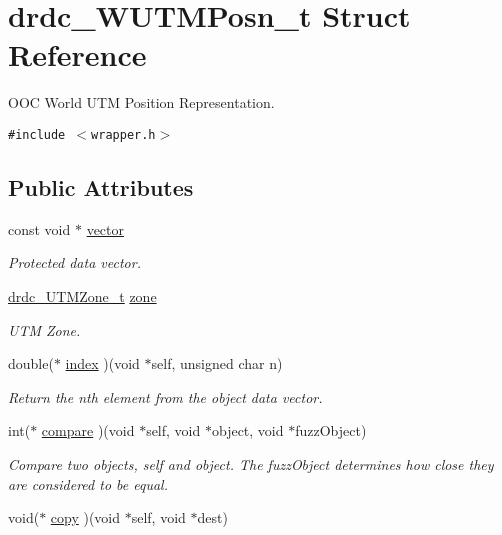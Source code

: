 \hypertarget{structdrdc__WUTMPosn__t}{
\section{drdc\_\-WUTMPosn\_\-t Struct Reference}
\label{structdrdc__WUTMPosn__t}
}
OOC World UTM Position Representation.  


{\tt \#include $<$wrapper.h$>$}

\subsection*{Public Attributes}
\begin{CompactItemize}
\item 
const void $\ast$ \hyperlink{structdrdc__WUTMPosn__t_70880a0baf98a0102abcc138be9fb8cf}{vector}
\begin{CompactList}\small\item\em Protected data vector. \item\end{CompactList}\item 
\hyperlink{structdrdc__UTMZone__t}{drdc\_\-UTMZone\_\-t} \hyperlink{structdrdc__WUTMPosn__t_932192c6467a673d6537e77421bdbb09}{zone}
\begin{CompactList}\small\item\em UTM Zone. \item\end{CompactList}\item 
double($\ast$ \hyperlink{structdrdc__WUTMPosn__t_93da68394919d2b437f14b2a6c622f31}{index} )(void $\ast$self, unsigned char n)
\begin{CompactList}\small\item\em Return the nth element from the object data vector. \item\end{CompactList}\item 
int($\ast$ \hyperlink{structdrdc__WUTMPosn__t_f39deedc7e308d049bf768ffa35dad45}{compare} )(void $\ast$self, void $\ast$object, void $\ast$fuzzObject)
\begin{CompactList}\small\item\em Compare two objects, self and object. The fuzzObject determines how close they are considered to be equal. \item\end{CompactList}\item 
void($\ast$ \hyperlink{structdrdc__WUTMPosn__t_4bdb61afed8ac02e0e2cbf077fe781ea}{copy} )(void $\ast$self, void $\ast$dest)

\end{CompactItemize}
